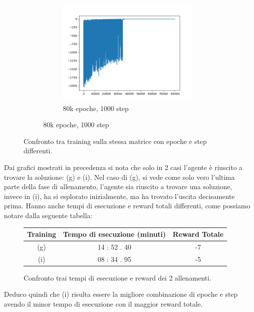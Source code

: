 \begin{figure}[H]
\begin{subfigure}{\textwidth}
\begin{subfigure}{.33\textwidth}
			\includegraphics[width=1\linewidth]{img/plot_80k_1000(2).png}
			\caption{80k epoche, 1000 step}
		\end{subfigure}%
	\end{subfigure}
	\caption{Confronto tra training sulla stessa matrice con epoche e step differenti.}
\end{figure}

Dai grafici mostrati in precedenza si nota che solo in 2 casi l'agente \`{e} riuscito a trovare la soluzione: (g) e (i). Nel caso di (g), si vede come solo vero l'ultima parte della fase di allenamento, l'agente sia riuscito a trovare una soluzione, invece in (i), ha si esplorato inizialmente, ma ha trovato l'uscita decisamente prima. Hanno anche tempi di esecuzione e reward totali differenti, come possiamo notare dalla seguente tabella:

\begin{figure}[H]
	\centering
	\begin{tabular}{c | c | c}
		\textbf{Training} & \textbf{Tempo di esecuzione (minuti)} & \textbf{Reward Totale}\\
		\hline
		(g) & 14 : 52 . 40 \rule{0pt}{1.2em} & -7\\
		(i) & 08 : 34 . 95 & -5\\
	\end{tabular}
	\caption{Confronto trai tempi di esecuzione e reward dei 2 allenamenti.}
\end{figure}

Deduco quindi che (i) risulta essere la migliore combinazione di epoche e step avendo il minor tempo di esecuzione con il maggior reward totale.

